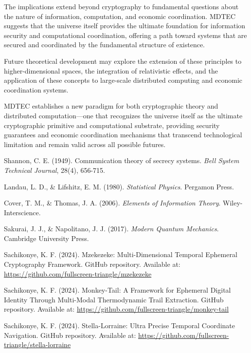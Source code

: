 \documentclass[12pt]{article}
\begin{document}
The implications extend beyond cryptography to fundamental questions about the nature of information, computation, and economic coordination. MDTEC suggests that the universe itself provides the ultimate foundation for information security and computational coordination, offering a path toward systems that are secured and coordinated by the fundamental structure of existence.

Future theoretical development may explore the extension of these principles to higher-dimensional spaces, the integration of relativistic effects, and the application of these concepts to large-scale distributed computing and economic coordination systems.

MDTEC establishes a new paradigm for both cryptographic theory and distributed computation—one that recognizes the universe itself as the ultimate cryptographic primitive and computational substrate, providing security guarantees and economic coordination mechanisms that transcend technological limitation and remain valid across all possible futures.

\begin{thebibliography}{9}

Shannon, C. E. (1949). Communication theory of secrecy systems. \textit{Bell System Technical Journal}, 28(4), 656-715.

Landau, L. D., \& Lifshitz, E. M. (1980). \textit{Statistical Physics}. Pergamon Press.

Cover, T. M., \& Thomas, J. A. (2006). \textit{Elements of Information Theory}. Wiley-Interscience.

Sakurai, J. J., \& Napolitano, J. J. (2017). \textit{Modern Quantum Mechanics}. Cambridge University Press.

Sachikonye, K. F. (2024). Mzekezeke: Multi-Dimensional Temporal Ephemeral Cryptography Framework. GitHub repository. Available at: \url{https://github.com/fullscreen-triangle/mzekezeke}

Sachikonye, K. F. (2024). Monkey-Tail: A Framework for Ephemeral Digital Identity Through Multi-Modal Thermodynamic Trail Extraction. GitHub repository. Available at: \url{https://github.com/fullscreen-triangle/monkey-tail}

Sachikonye, K. F. (2024). Stella-Lorraine: Ultra Precise Temporal Coordinate Navigation. GitHub repository. Available at: \url{https://github.com/fullscreen-triangle/stella-lorraine}

\end{thebibliography}
\end{document}
